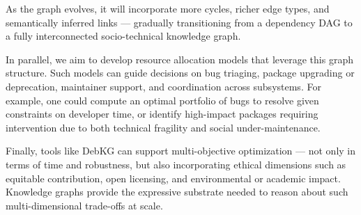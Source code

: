 \documentclass[10pt,oneside,a4paper, twocolumn]{article}
\begin{document}
    As the graph evolves, it will incorporate more cycles, richer edge types, and semantically inferred links — gradually transitioning from a dependency DAG to a fully interconnected socio-technical knowledge graph.

    In parallel, we aim to develop resource allocation models that leverage this graph structure.
    Such models can guide decisions on bug triaging, package upgrading or deprecation, maintainer support, and coordination across subsystems.
    For example, one could compute an optimal portfolio of bugs to resolve given constraints on developer time, or identify high-impact packages requiring intervention due to both technical fragility and social under-maintenance.

    Finally, tools like DebKG can support multi-objective optimization — not only in terms of time and robustness, but also incorporating ethical dimensions such as equitable contribution, open licensing, and environmental or academic impact.
    Knowledge graphs provide the expressive substrate needed to reason about such multi-dimensional trade-offs at scale.


    
    
\end{document}
